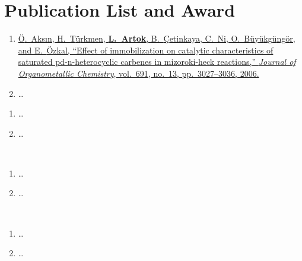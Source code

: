 \chapter{Publication List and Award}


\begin{enumerate}
\item \href{http://10.1016/j.jorganchem.2006.03.012}{{\"O}.~Aks{\i}n, H.~T{\"u}rkmen, \textbf{L.~Artok}, B.~{\c{C}}etinkaya, C.~Ni, 
  O.~B{\"u}y{\"u}kg{\"u}ng{\"o}r, and E.~{\"O}zkal, ``Effect of immobilization
  on catalytic characteristics of saturated pd-n-heterocyclic carbenes in
  mizoroki-heck reactions,'' {\em Journal of Organometallic Chemistry},
  vol.~691, no.~13, pp.~3027--3036, 2006.}

\item \ldots

\end{enumerate}
\vspace{2ex}



\begin{enumerate}

\item \ldots

\item \ldots

\end{enumerate}
\vspace{2ex}



\\
\begin{enumerate}

\item \ldots

\item \ldots

\end{enumerate}
\vspace{2ex}



\\

\begin{enumerate}
\item \ldots

\item \ldots
\end{enumerate}